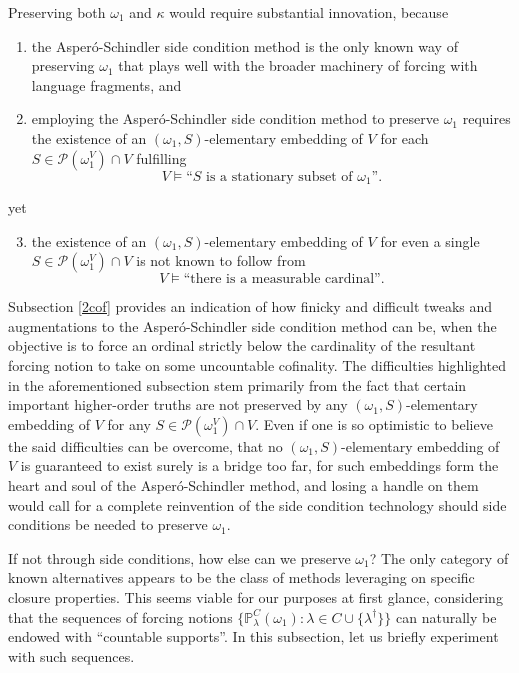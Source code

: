 \documentclass[12pt, twoside]{memoir}
\numberwithin{equation}{section}
\theoremstyle{definition}
\theoremstyle{remark}
\theoremstyle{definition}
\theoremstyle{definition}
\theoremstyle{definition}
\theoremstyle{remark}
\begin{document}
Preserving both $\omega_1$ and $\kappa$ would require substantial innovation, because
\begin{enumerate}[label=(\alph*)]
    \item the Asper\'{o}-Schindler side condition method is the only known way of preserving $\omega_1$ that plays well with the broader machinery of forcing with language fragments, and
    \item employing the Asper\'{o}-Schindler side condition method to preserve $\omega_1$ requires the existence of an $(\omega_1, S)$-elementary embedding of $V$ for each $S \in \mathcal{P}(\omega_1^V) \cap V$ fulfilling
    \begin{equation*}
        V \vDash \text{``} S \text{ is a stationary subset of } \omega_1 \text{''.}
    \end{equation*}
\end{enumerate}
yet
\begin{enumerate}[label=(\alph*)]
    \setcounter{enumi}{2}
    \item the existence of an $(\omega_1, S)$-elementary embedding of $V$ for even a single $S \in \mathcal{P}(\omega_1^V) \cap V$ is not known to follow from 
    \begin{equation*}
        V \vDash \text{``there is a measurable cardinal''.}
    \end{equation*}
\end{enumerate}
Subsection \ref{2cof} provides an indication of how finicky and difficult tweaks and augmentations to the Asper\'{o}-Schindler side condition method can be, when the objective is to force an ordinal strictly below the cardinality of the resultant forcing notion to take on some uncountable cofinality. The difficulties highlighted in the aforementioned subsection stem primarily from the fact that certain important higher-order truths are not preserved by any $(\omega_1, S)$-elementary embedding of $V$ for any $S \in \mathcal{P}(\omega_1^V) \cap V$. Even if one is so optimistic to believe the said difficulties can be overcome, that no $(\omega_1, S)$-elementary embedding of $V$ is guaranteed to exist surely is a bridge too far, for such embeddings form the heart and soul of the Asper\'{o}-Schindler method, and losing a handle on them would call for a complete reinvention of the side condition technology should side conditions be needed to preserve $\omega_1$. 

If not through side conditions, how else can we preserve $\omega_1$? The only category of known alternatives appears to be the class of methods leveraging on specific closure properties. This seems viable for our purposes at first glance, considering that the sequences of forcing notions $\{\mathbb{P}^C_{\lambda}(\omega_1) : \lambda \in C \cup \{\lambda^{\dagger}\}\}$ can naturally be endowed with ``countable supports''. In this subsection, let us briefly experiment with such sequences. 
\end{document}
